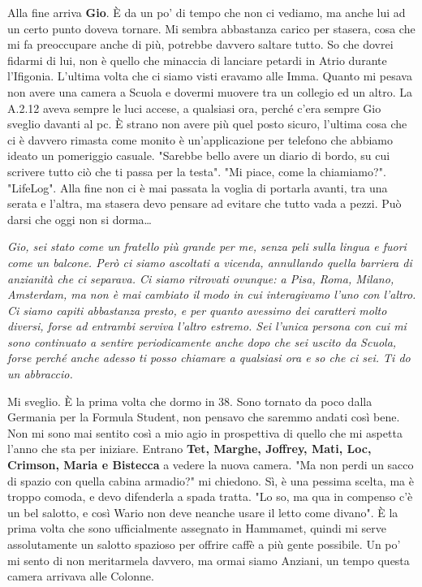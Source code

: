 Alla fine arriva \textbf{Gio}. È da un po' di tempo che non ci vediamo, ma anche lui ad un certo punto doveva tornare. Mi sembra abbastanza carico per stasera, cosa che mi fa preoccupare anche di più, potrebbe davvero saltare tutto. So che dovrei fidarmi di lui, non è quello che minaccia di lanciare petardi in Atrio durante l'Ifigonia. L'ultima volta che ci siamo visti eravamo alle Imma. Quanto mi pesava non avere una camera a Scuola e dovermi muovere tra un collegio ed un altro. La A.2.12 aveva sempre le luci accese, a qualsiasi ora, perché c'era sempre Gio sveglio davanti al pc. È strano non avere più quel posto sicuro, l'ultima cosa che ci è davvero rimasta come monito è un'applicazione per telefono che abbiamo ideato un pomeriggio casuale. "Sarebbe bello avere un diario di bordo, su cui scrivere tutto ciò che ti passa per la testa". "Mi piace, come la chiamiamo?". "LifeLog". Alla fine non ci è mai passata la voglia di portarla avanti, tra una serata e l'altra, ma stasera devo pensare ad evitare che tutto vada a pezzi. Può darsi che oggi non si dorma\dots
\vspace{5mm}

\newpage
\textit{Gio, sei stato come un fratello più grande per me, senza peli sulla lingua e fuori come un balcone. Però ci siamo ascoltati a vicenda, annullando quella barriera di anzianità che ci separava. Ci siamo ritrovati ovunque: a Pisa, Roma, Milano, Amsterdam, ma non è mai cambiato il modo in cui interagivamo l'uno con l'altro. Ci siamo capiti abbastanza presto, e per quanto avessimo dei caratteri molto diversi, forse ad entrambi serviva l'altro estremo. Sei l'unica persona con cui mi sono continuato a sentire periodicamente anche dopo che sei uscito da Scuola, forse perché anche adesso ti posso chiamare a qualsiasi ora e so che ci sei. Ti do un abbraccio.}

\separatore

Mi sveglio. È la prima volta che dormo in 38. Sono tornato da poco dalla Germania per la Formula Student, non pensavo che saremmo andati così bene. Non mi sono mai sentito così a mio agio in prospettiva di quello che mi aspetta l'anno che sta per iniziare. Entrano \textbf{Tet, Marghe, Joffrey, Mati, Loc, Crimson, Maria e Bistecca} a vedere la nuova camera. "Ma non perdi un sacco di spazio con quella cabina armadio?" mi chiedono. Sì, è una pessima scelta, ma è troppo comoda, e devo difenderla a spada tratta. "Lo so, ma qua in compenso c'è un bel salotto, e così Wario non deve neanche usare il letto come divano". È la prima volta che sono ufficialmente assegnato in Hammamet, quindi mi serve assolutamente un salotto spazioso per offrire caffè a più gente possibile. Un po' mi sento di non meritarmela davvero, ma ormai siamo Anziani, un tempo questa camera arrivava alle Colonne.
\vspace{5mm}

